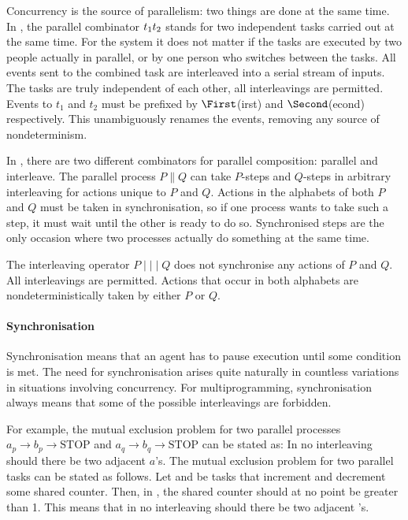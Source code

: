 Concurrency is the source of parallelism: two things are done at the same time.
%
In \TOP, the parallel combinator $t_1 \relax t_2$ stands for two independent tasks carried out at the same time.
For the system it does not matter if the tasks are executed by two people actually in parallel, or by one person who switches between the tasks.
All events sent to the combined task are interleaved into a serial stream of inputs.
The tasks are truly independent of each other, all interleavings are permitted.
Events to $t_1$ and $t_2$ must be prefixed by $\First$(irst) and $\Second$(econd) respectively.
This unambiguously renames the events, removing any source of nondeterminism.

In \CSP, there are two different combinators for parallel composition: parallel and interleave.
The parallel process $P \parallel Q$ can take $P$-steps and $Q$-steps in arbitrary interleaving for actions unique to $P$ and $Q$.
Actions in the alphabets of both $P$ and $Q$ must be taken in synchronisation, so if one process wants to take such a step, it must wait until the other is ready to do so.
Synchronised steps are the only occasion where two processes actually do something at the same time.

The interleaving operator $P \mid\mid\mid Q$ does not synchronise any actions of $P$ and $Q$.
All interleavings are permitted.
Actions that occur in both alphabets are nondeterministically taken by either $P$ or $Q$.



\paragraph{Synchronisation}

Synchronisation means that an agent has to pause execution until some condition is met.
The need for synchronisation arises quite naturally in countless variations in situations involving concurrency.
For multiprogramming, synchronisation always means that some of the possible interleavings are forbidden.

For example, the mutual exclusion problem for two parallel processes $a_p \to b_p \to \text{STOP} $ and $a_q \to b_q \to \text{STOP}$ can be stated as:
In no interleaving should there be two adjacent $a$'s.
%
The mutual exclusion problem for two parallel tasks can be stated as follows.
Let  and  be tasks that increment and decrement some shared counter.
Then, in , the shared counter should at no point be greater than 1.
This means that in no interleaving should there be two adjacent 's.

